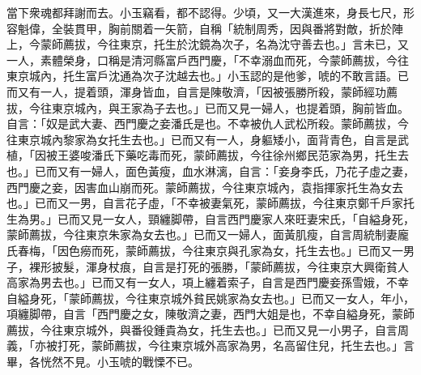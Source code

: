 當下衆魂都拜謝而去。小玉竊看，都不認得。{}少頃，又一大漢進來，身長七尺，形容魁偉，全裝貫甲，胸前關着一矢箭，自稱「統制周秀，因與番將對敵，折於陣上，今蒙師薦拔，今往東京，托生於沈鏡為次子，名為沈守善去也。」言未已，又一人，素體榮身，口稱是清河縣富戶西門慶，「不幸溺血而死，今蒙師薦拔，今往東京城內，托生富戶沈通為次子沈越去也。」小玉認的是他爹，唬的不敢言語。已而又有一人，提着頭，渾身皆血，自言是陳敬濟，「因被張勝所殺，蒙師經功薦拔，今往東京城內，與王家為子去也。」已而又見一婦人，也提着頭，胸前皆血。自言：「奴是武大妻、西門慶之妾潘氏是也。不幸被仇人武松所殺。蒙師薦拔，今往東京城內黎家為女托生去也。」已而又有一人，身軀矮小，面背青色，自言是武植，「因被王婆唆潘氏下藥吃毒而死，蒙師薦拔，今往徐州鄉民范家為男，托生去也。」{}已而又有一婦人，面色黃瘦，血水淋漓，自言：「妾身李氏，乃花子虛之妻，西門慶之妾，因害血山崩而死。蒙師薦拔，今往東京城內，袁指揮家托生為女去也。」已而又一男，自言花子虛，「不幸被妻氣死，蒙師薦拔，今往東京鄭千戶家托生為男。」已而又見一女人，頸纏脚帶，自言西門慶家人來旺妻宋氏，「自縊身死，蒙師薦拔，今往東京朱家為女去也。」已而又一婦人，面黃肌瘦，自言周統制妻龐氏春梅，「因色癆而死，蒙師薦拔，今往東京與孔家為女，托生去也。」已而又一男子，裸形披髮，渾身杖痕，自言是打死的張勝，「蒙師薦拔，今往東京大興衛貧人高家為男去也。」已而又有一女人，項上纏着索子，自言是西門慶妾孫雪娥，不幸自縊身死，「蒙師薦拔，今往東京城外貧民姚家為女去也。」已而又一女人，年小，項纏脚帶，自言「西門慶之女，陳敬濟之妻，西門大姐是也，不幸自縊身死，蒙師薦拔，今往東京城外，與番役鍾貴為女，托生去也。」已而又見一小男子，自言周義，「亦被打死，蒙師薦拔，今往東京城外高家為男，名高留住兒，托生去也。」言畢，各恍然不見。小玉唬的戰慄不已。

